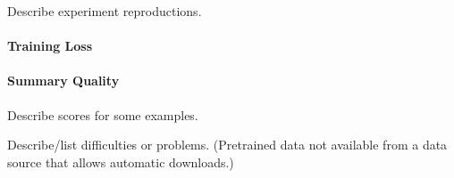 Describe experiment reproductions.

\paragraph{Training Loss}




\paragraph{Summary Quality}

Describe \Rouge scores for some examples.

Describe/list difficulties or problems. (Pretrained data not available from a data source that allows automatic downloads.)
